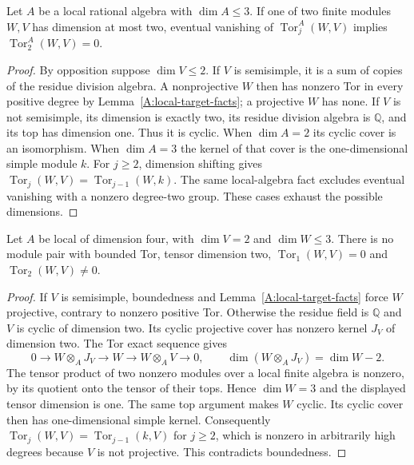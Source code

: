 \begin{lemma}
\label{CP2:A-local-three-small-module}
Let $A$ be a local rational algebra with $\dim A\leq3$.
If one of two finite modules $W,V$ has dimension at most
two, eventual vanishing of $\operatorname{Tor}^A_j(W,V)$
implies $\operatorname{Tor}^A_2(W,V)=0$.
\end{lemma}
\begin{proof}
By opposition suppose $\dim V\leq2$. If $V$ is
semisimple, it is a sum of copies of the residue
division algebra. A nonprojective $W$ then has
nonzero Tor in every positive degree by
Lemma~\ref{A:local-target-facts}; a projective $W$
has none. If $V$ is not semisimple, its dimension
is exactly two, its residue division algebra is
$\mathbb Q$, and its top has dimension one.
Thus it is cyclic. When $\dim A=2$ its cyclic
cover is an isomorphism. When $\dim A=3$ the
kernel of that cover is the one-dimensional simple
module $k$. For $j\geq2$, dimension shifting gives
$\operatorname{Tor}_j(W,V)=\operatorname{Tor}_{j-1}(W,k)$.
The same local-algebra fact excludes eventual
vanishing with a nonzero degree-two group. These
cases exhaust the possible dimensions.
\end{proof}

\begin{lemma}
\label{CP2:A-local-four-rank-two}
Let $A$ be local of dimension four, with
$\dim V=2$ and $\dim W\leq3$. There is no module
pair with bounded Tor, tensor dimension two,
$\operatorname{Tor}_1(W,V)=0$ and
$\operatorname{Tor}_2(W,V)\ne0$.
\end{lemma}
\begin{proof}
If $V$ is semisimple, boundedness and
Lemma~\ref{A:local-target-facts} force $W$ projective,
contrary to nonzero positive Tor. Otherwise the residue
field is $\mathbb Q$ and $V$ is cyclic of dimension
two. Its cyclic projective cover has nonzero kernel
$J_V$ of dimension two. The Tor exact sequence gives
\[
 0\to W\otimes_AJ_V\to W\to W\otimes_AV\to0,
 \qquad \dim(W\otimes_AJ_V)=\dim W-2.
\]
The tensor product of two nonzero modules over a local
finite algebra is nonzero, by its quotient onto the
tensor of their tops. Hence $\dim W=3$ and the
displayed tensor dimension is one. The same top
argument makes $W$ cyclic. Its cyclic cover then
has one-dimensional simple kernel. Consequently
$\operatorname{Tor}_j(W,V)=\operatorname{Tor}_{j-1}(k,V)$
for $j\geq2$, which is nonzero in arbitrarily high
degrees because $V$ is not projective. This contradicts
boundedness.
\end{proof}

